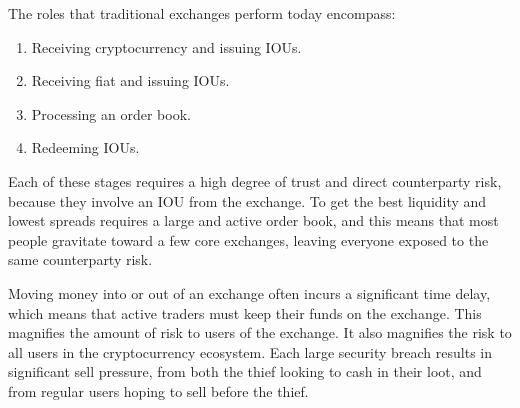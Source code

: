 The roles that traditional exchanges perform today encompass:

\begin{enumerate}
 \item Receiving cryptocurrency and issuing IOUs.
 \item Receiving fiat and issuing IOUs.
 \item Processing an order book.
 \item Redeeming IOUs.
\end{enumerate}

Each of these stages requires a high degree of trust and direct counterparty
risk, because they involve an IOU from the exchange. To get the best
liquidity and lowest spreads requires a large and active order book, and this
means that most people gravitate toward a few core exchanges, leaving everyone
exposed to the same counterparty risk.

Moving money into or out of an exchange often incurs a significant time delay,
which means that active traders must keep their funds on the exchange. This
magnifies the amount of risk to users of the exchange. It also magnifies the
risk to all users in the cryptocurrency ecosystem. Each large security breach
results in significant sell pressure, from both the thief looking to cash in
their loot, and from regular users hoping to sell before the thief.
